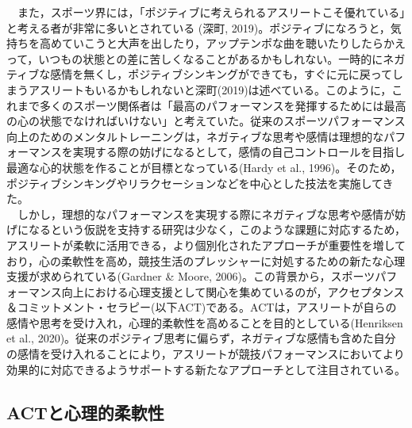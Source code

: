\documentclass[12pt,a4paper,xelatex,ja=standard]{bxjsarticle}
\begin{document}
　また，スポーツ界には，「ポジティブに考えられるアスリートこそ優れている」と考える者が非常に多いとされている
(深町,
2019)。ポジティブになろうと，気持ちを高めていこうと大声を出したり，アップテンポな曲を聴いたりしたらかえって，いつもの状態との差に苦しくなることがあるかもしれない。一時的にネガティブな感情を無くし，ポジティブシンキングができても，すぐに元に戻ってしまうアスリートもいるかもしれないと深町(2019)は述べている。このように，これまで多くのスポーツ関係者は「最高のパフォーマンスを発揮するためには最高の心の状態でなければいけない」と考えていた。従来のスポーツパフォーマンス向上のためのメンタルトレーニングは，ネガティブな思考や感情は理想的なパフォーマンスを実現する際の妨げになるとして，感情の自己コントロールを目指し最適な心的状態を作ることが目標となっている(Hardy
et al.,
1996)。そのため，ポジティブシンキングやリラクセーションなどを中心とした技法を実施してきた。\\
　しかし，理想的なパフォーマンスを実現する際にネガティブな思考や感情が妨げになるという仮説を支持する研究は少なく，このような課題に対応するため，アスリートが柔軟に活用できる，より個別化されたアプローチが重要性を増しており，心の柔軟性を高め，競技生活のプレッシャーに対処するための新たな心理支援が求められている(Gardner
\& Moore,
2006)。この背景から，スポーツパフォーマンス向上における心理支援として関心を集めているのが，アクセプタンス＆コミットメント・セラピー(以下ACT)である。ACTは，アスリートが自らの感情や思考を受け入れ，心理的柔軟性を高めることを目的としている(Henriksen
et al.,
2020)。従来のポジティブ思考に偏らず，ネガティブな感情も含めた自分の感情を受け入れることにより，アスリートが競技パフォーマンスにおいてより効果的に対応できるようサポートする新たなアプローチとして注目されている。

\hypertarget{actux3068ux5fc3ux7406ux7684ux67d4ux8edfux6027}{%
\subsection{ACTと心理的柔軟性}\label{actux3068ux5fc3ux7406ux7684ux67d4ux8edfux6027}}
\end{document}
